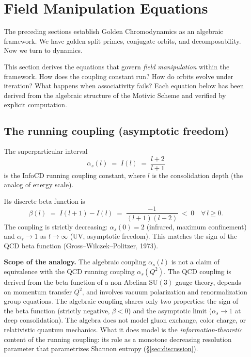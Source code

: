 \section{Field Manipulation Equations}
\label{sec:field_equations}

The preceding sections establish Golden Chromodynamics as an algebraic framework. We have golden split primes, conjugate orbits, and decomposability. Now we turn to dynamics.

This section derives the equations that govern \emph{field manipulation} within the framework. How does the coupling constant run? How do orbits evolve under iteration? What happens when associativity fails? Each equation below has been derived from the algebraic structure of the Motivic Scheme and verified by explicit computation.

\subsection{The running coupling (asymptotic freedom)}

The superparticular interval
\[
\alpha_s(l) \;=\; I(l) \;=\; \frac{l + 2}{l + 1}
\]
is the InfoCD running coupling constant, where $l$ is the
consolidation depth (the analog of energy scale).

Its discrete beta function is
\[
\beta(l) \;=\; I(l+1) - I(l) \;=\; \frac{-1}{(l+1)(l+2)} \;<\; 0
\quad \forall\, l \geq 0.
\]
The coupling is strictly decreasing: $\alpha_s(0) = 2$ (infrared,
maximum confinement) and $\alpha_s \to 1$ as $l \to \infty$ (UV,
asymptotic freedom). This matches the sign of the QCD beta function
(Gross--Wilczek--Politzer, 1973).

\textbf{Scope of the analogy.} The algebraic coupling $\alpha_s(l)$
is not a claim of equivalence with the QCD running coupling
$\alpha_s(Q^2)$. The QCD coupling is derived from the beta function
of a non-Abelian $\mathrm{SU}(3)$ gauge theory, depends on momentum
transfer $Q^2$, and involves vacuum polarization and renormalization
group equations. The algebraic coupling shares only two properties:
the sign of the beta function (strictly negative, $\beta < 0$) and
the asymptotic limit ($\alpha_s \to 1$ at deep consolidation). The
algebra does not model gluon exchange, color charge, or relativistic
quantum mechanics. What it does model is the \emph{information-theoretic}
content of the running coupling: its role as a monotone decreasing
resolution parameter that parametrizes Shannon entropy
(\S\ref{sec:discussion}).

